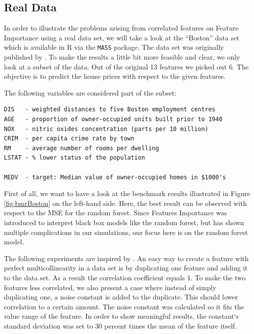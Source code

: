 \documentclass[
]{krantz}
\begin{document}
\hypertarget{real-data}{%
\subsection{Real Data}\label{real-data}}

In order to illustrate the problems arising from correlated features on Feature Importance using a real data set, we will take a look at the ``Boston'' data set which is available in R via the \texttt{MASS} package. The data set was originally published by \citet{harrison1978}. To make the results a little bit more feasible and clear, we only look at a subset of the data. Out of the original 13 features we picked out 6. The objective is to predict the house prices with respect to the given features.

The following variables are considered part of the subset:

\begin{verbatim}
DIS   - weighted distances to five Boston employment centres
AGE   - proportion of owner-occupied units built prior to 1940
NOX   - nitric oxides concentration (parts per 10 million)
CRIM  - per capita crime rate by town
RM    - average number of rooms per dwelling
LSTAT - % lower status of the population

MEDV  - target: Median value of owner-occupied homes in $1000's
\end{verbatim}

First of all, we want to have a look at the benchmark results illustrated in Figure \ref{fig:bmrBoston} on the left-hand side. Here, the best result can be observed with respect to the MSE for the random forest. Since Features Importance was introduced to interpret black box models like the random forest, but has shown multiple complications in our simulations, our focus here is on the random forest model.

The following experiments are inspired by \citet{parr2018}. An easy way to create a feature with perfect multicollinearity in a data set is by duplicating one feature and adding it to the data set. As a result the correlation coefficient equals 1. To make the two features less correlated, we also present a case where instead of simply duplicating one, a noise constant is added to the duplicate. This should lower correlation to a certain amount. The noise constant was calculated so it fits the value range of the feature. In order to show meaningful results, the constant`s standard deviation was set to 30 percent times the mean of the feature itself.
\end{document}
